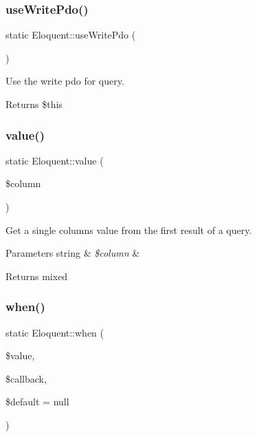 \subsubsection{\texorpdfstring{use\+Write\+Pdo()}{useWritePdo()}}
{\footnotesize\ttfamily static Eloquent\+::use\+Write\+Pdo (\begin{DoxyParamCaption}{ }\end{DoxyParamCaption})\hspace{0.3cm}{\ttfamily [static]}}

Use the write pdo for query.

\begin{DoxyReturn}{Returns}
\$this 
\end{DoxyReturn}
\mbox{\label{class_eloquent_a653061eb837042f61e82447886e15a72}} 
\subsubsection{\texorpdfstring{value()}{value()}}
{\footnotesize\ttfamily static Eloquent\+::value (\begin{DoxyParamCaption}\item[{}]{\$column }\end{DoxyParamCaption})\hspace{0.3cm}{\ttfamily [static]}}

Get a single column\textquotesingle{}s value from the first result of a query.


\begin{DoxyParams}[1]{Parameters}
string & {\em \$column} & \\
\hline
\end{DoxyParams}
\begin{DoxyReturn}{Returns}
mixed 
\end{DoxyReturn}
\mbox{\label{class_eloquent_a72b824dce01f0fa80a87803b42b46ad2}} 
\subsubsection{\texorpdfstring{when()}{when()}}
{\footnotesize\ttfamily static Eloquent\+::when (\begin{DoxyParamCaption}\item[{}]{\$value,  }\item[{}]{\$callback,  }\item[{}]{\$default = {\ttfamily null} }\end{DoxyParamCaption})\hspace{0.3cm}{\ttfamily [static]}}

